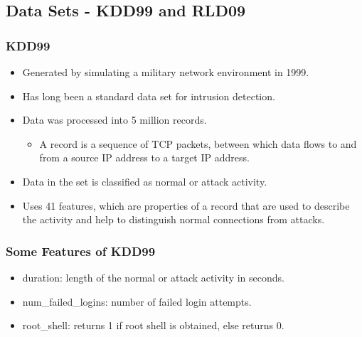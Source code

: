 \documentclass{beamer}
\begin{document}
\subsection{Data Sets - KDD99 and RLD09}
\begin{frame}
  \frametitle{KDD99}
	\begin{itemize}
		\item Generated by simulating a military network environment in 1999.
		\item Has long been a standard data set for intrusion detection.
		\item Data was processed into 5 million records.
			\begin{itemize}
				\item A record is a sequence of TCP packets, between which data flows to and from a source IP address to a target IP address.
			\end{itemize}
		\item Data in the set is classified as normal or attack activity.
		\item Uses 41 features, which are properties of a record that are used to describe the activity and help to distinguish normal connections from attacks.

	\end{itemize}
\end{frame}


\begin{frame}
  \frametitle{Some Features of KDD99}
	\begin{itemize}
		\item duration: length of the normal or attack activity
in seconds.
		\item num\_failed\_logins: number of failed login attempts.
		\item root\_shell: returns 1 if root shell is obtained, else returns 0.
	\end{itemize}
\end{frame}
\end{document}
